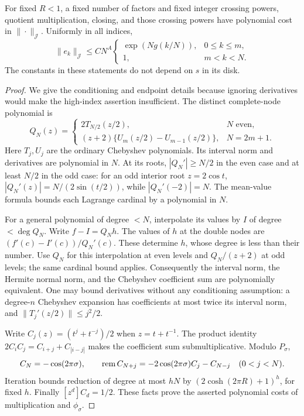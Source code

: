 \begin{lemma}\label{cta:norms}
For fixed \(R<1\), a fixed number of factors and fixed integer
crossing powers, quotient multiplication, closing, and those
crossing powers have polynomial cost in \(\|\cdot\|_{\mathcal J}\).
Uniformly in all indices,
\begin{equation}\label{cta:basis-bound}
 \|e_k\|_{\mathcal J}\le C N^A
 \begin{cases}
   \exp(Ng(k/N)),&0\le k\le m,\\
   1,&m<k<N .
 \end{cases}
\end{equation}
The constants in these statements do not depend on \(s\) in its disk.
\end{lemma}
\begin{proof}
We give the conditioning and endpoint details because ignoring
derivatives would make the high-index assertion insufficient.
The distinct complete-node polynomial is
\[
 Q_N(z)=
 \begin{cases}
  2T_{N/2}(z/2),&N\text{ even},\\
  (z+2)\{U_m(z/2)-U_{m-1}(z/2)\},&N=2m+1.
 \end{cases}
\]
Here \(T_j,U_j\) are the ordinary Chebyshev polynomials.
Its interval norm and derivatives are polynomial in \(N\).
At its roots, \(|Q_N'|\ge N/2\) in the even case and at least
\(N/2\) in the odd case: for an odd interior root \(z=2\cos t\),
\(|Q_N'(z)|=N/(2\sin(t/2))\), while \(|Q_N'(-2)|=N\).
The mean-value formula bounds each Lagrange cardinal by a
polynomial in \(N\).

For a general polynomial of degree \(<N\), interpolate its values
by \(I\) of degree \(<\deg Q_N\). Write \(f-I=Q_N h\).
The values of \(h\) at the double nodes are
\((f'(c)-I'(c))/Q_N'(c)\). These determine \(h\), whose degree
is less than their number. Use \(Q_N\) for this interpolation at
even levels and \(Q_N/(z+2)\) at odd levels; the same cardinal
bound applies. Consequently the interval norm, the Hermite
normal norm, and the Chebyshev coefficient sum are polynomially
equivalent. One may bound derivatives without any conditioning
assumption: a degree-\(n\) Chebyshev expansion has coefficients
at most twice its interval norm, and
\(\|T_j'(z/2)\|\le j^2/2\).

Write \(C_j(z)=(t^j+t^{-j})/2\) when \(z=t+t^{-1}\).
The product identity \(2C_iC_j=C_{i+j}+C_{|i-j|}\) makes
the coefficient sum submultiplicative. Modulo \(P_\sigma\),
\[
 C_N=-\cos(2\pi\sigma),\qquad
 \operatorname{rem} C_{N+j}=-2\cos(2\pi\sigma)C_j-C_{N-j}\quad(0<j<N).
\]
Iteration bounds reduction of degree at most \(hN\) by
\((2\cosh(2\pi R)+1)^h\), for fixed \(h\).
Finally \([z^d]C_d=1/2\). These facts prove the asserted
polynomial costs of multiplication and \(\phi_\sigma\).


\end{proof}
